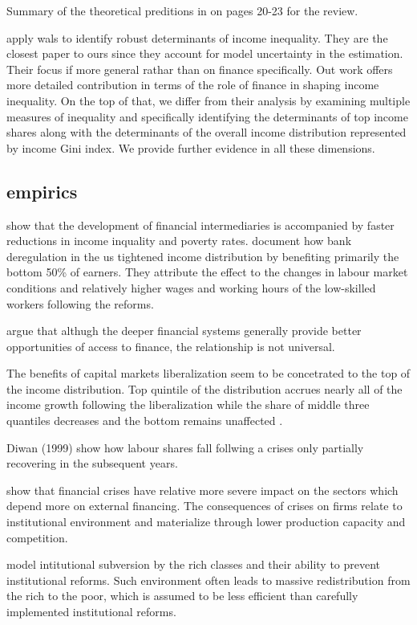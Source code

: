 \documentclass[a4paper,11pt]{article}
\begin{document}
Summary of the theoretical preditions in \citet{demirgucc2009finance} on pages 20-23 for the review.

\citet{furceri2019robust} apply \ac{wals} to identify robust determinants of income inequality. They are the closest paper to ours since they account for model uncertainty in the estimation. Their focus if more general rathar than on finance specifically. Out work offers more detailed contribution in terms of the role of finance in shaping income inequality. On the top of that, we differ from their analysis by examining multiple measures of inequality and specifically identifying the determinants of top income shares along with the determinants of the overall income distribution represented by income Gini index. We provide further evidence in all these dimensions.

\subsection{empirics}
\citet{beck2007finance} show that the development of financial intermediaries is accompanied by faster reductions in income inquality and poverty rates.
\citet{beck2010big} document how bank deregulation in the \ac{us} tightened income distribution by benefiting primarily the bottom 50\% of earners. They attribute the effect to the changes in labour market conditions and relatively higher wages and working hours of the low-skilled workers following the reforms.

\citet{claessens2007finance} argue that althugh the deeper financial systems generally provide better opportunities of access to finance, the relationship is not universal.

The benefits of capital markets liberalization seem to be concetrated to the top of the income distribution. Top quintile of the distribution accrues nearly all of the income growth following the liberalization while the share of middle three quantiles decreases and the bottom remains unaffected \citep{das2003income}.

Diwan (1999) show how labour shares fall follwing a crises only partially recovering in the subsequent years.

\citet{kroszneretal2007} show that financial crises have relative more severe impact on the sectors which depend more on external financing. The consequences of crises on firms relate to institutional environment and materialize through lower production capacity and competition.

\citet{glaeseretal2003} model intitutional subversion by the rich classes and their ability to prevent institutional reforms. Such environment often leads to massive redistribution from the rich to the poor, which is assumed to be less efficient than carefully implemented institutional reforms.
\end{document}
